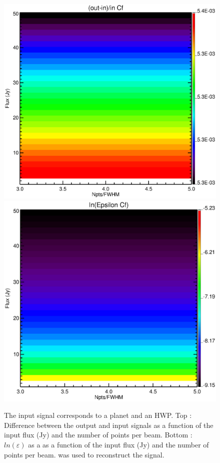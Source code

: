 \begin{figure}[h]
\center
	\includegraphics[scale=0.5]{Figures/diff_cf_planet_hwp.eps}
	\includegraphics[scale=0.5]{Figures/epsilon_cf_planet_hwp.eps}
	\caption{The input signal corresponds to a planet and an HWP. Top : Difference between the output and input signals as a function of the input flux (Jy) and the number of points per beam. Bottom : $ln(\varepsilon)$ as a as a function of the input flux (Jy) and the number of points per beam. \cf was used to reconstruct the signal.}
	\label{fig:epsilon-cf-planet-hwp}
\end{figure}


